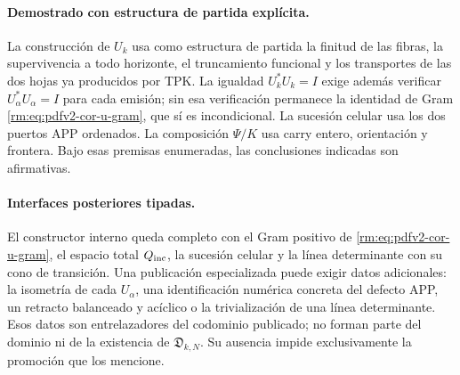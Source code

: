 \paragraph{Demostrado con estructura de partida explícita.}
La construcción de \(U_k\) usa como estructura de partida la finitud de las
fibras, la supervivencia a todo horizonte, el truncamiento funcional y los
transportes de las dos hojas ya producidos por TPK\@. La igualdad
\(U_k^*U_k=I\) exige además verificar \(U_\alpha^*U_\alpha=I\) para cada
emisión; sin esa verificación permanece la identidad de Gram
\eqref{rm:eq:pdfv2-cor-u-gram}, que sí es incondicional. La sucesión celular usa
los dos puertos APP ordenados. La composición \(\Psi/K\) usa carry entero,
orientación y frontera. Bajo esas premisas enumeradas, las conclusiones
indicadas son afirmativas.

\paragraph{Interfaces posteriores tipadas.}
El constructor interno queda completo con el Gram positivo de
\eqref{rm:eq:pdfv2-cor-u-gram}, el espacio total \(Q_{\rm inc}\), la sucesión
celular y la línea determinante con su cono de transición. Una publicación
especializada puede exigir datos adicionales: la isometría de cada
\(U_\alpha\), una identificación numérica concreta del defecto APP, un
retracto balanceado y acíclico o la trivialización de una línea
determinante. Esos datos son entrelazadores del codominio publicado; no
forman parte del dominio ni de la existencia de
\(\mathfrak D_{k,N}\). Su ausencia impide exclusivamente la promoción que
los mencione.

